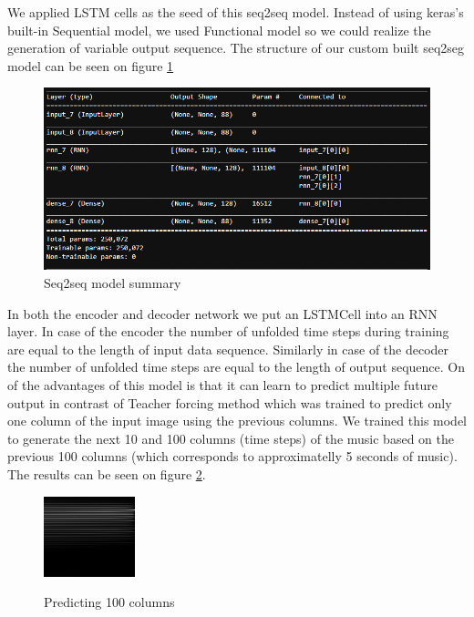 \documentclass{article}
\begin{document}
We applied LSTM cells as the seed of this seq2seq model. Instead of using keras's built-in Sequential model, we used Functional model so we could realize the generation of variable output sequence. The structure of our custom built seq2seg model can be seen on figure \ref{fig:seq2seqsummary}
\begin{figure}[!htb]
	\centering
	\includegraphics[width=0.8\linewidth]{seq2seqsummary.png}
	\caption{Seq2seq model summary}
	\label{fig:seq2seqsummary}
\end{figure}
In both the encoder and decoder network we put an LSTMCell into an RNN layer. In case of the encoder the number of unfolded time steps during training are equal to the length of input data sequence. Similarly in case of the decoder the number of unfolded time steps are equal to the length of output sequence.
On of the advantages of this model is that it can learn to predict multiple future output in contrast of Teacher forcing method which was trained to predict only one column of the input image using the previous columns. 
We trained this model to generate the next 10 and 100 columns (time steps) of the music based on the previous 100 columns (which corresponds to approximatelly 5 seconds of music). The results can be seen on figure \ref{fig:seq2seqresult1}.

\begin{figure}[!htb]
	\centering
	\caption{Predicting 100 columns}{
		\includegraphics[width=0.48\linewidth]{seq2seqresult1.png}}
	\label{fig:seq2seqresult1}
\end{figure}
\end{document}
